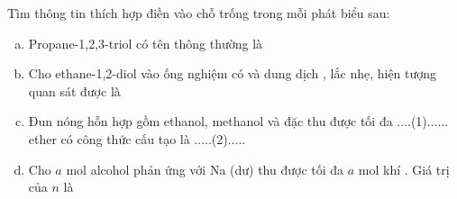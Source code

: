 \documentclass[12pt,a4paper]{article}
\begin{document}
\begin{ex}
Tìm thông tin thích hợp điền vào chỗ trống trong mỗi phát biểu sau:
\begin{enumerate}[a)]
    \item Propane-1,2,3-triol có tên thông thường là \dotfill
    \item Cho ethane-1,2-diol vào ống nghiệm có  và dung dịch , lắc nhẹ, hiện tượng quan sát được là \dotfill
    \item Đun nóng hỗn hợp gồm ethanol, methanol và  đặc thu được tối đa ....(1)...... ether có công thức cấu tạo là .....(2).....
    \item Cho $a$ mol alcohol  phản ứng với Na (dư) thu được tối đa $a$ mol khí . Giá trị của $n$ là \dotfill
\end{enumerate}


\end{ex}
\end{document}
